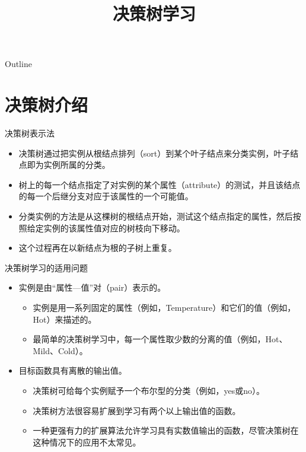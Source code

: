 \documentclass[presentation]{beamer}
\date{}
\title{决策树学习}
\begin{document}
\maketitle
\begin{frame}{Outline}
\tableofcontents
\end{frame}







\section{决策树介绍}
\label{sec:orgd053a1c}
\begin{frame}[label={sec:org9dfa2b5}]{决策树表示法}
\begin{itemize}
\item 决策树通过把实例从根结点排列（sort）到某个叶子结点来分类实例，叶子结点即为实例所属的分类。
\item 树上的每一个结点指定了对实例的某个属性（attribute）的测试，并且该结点的每一个后继分支对应于该属性的一个可能值。
\item 分类实例的方法是从这棵树的根结点开始，测试这个结点指定的属性，然后按照给定实例的该属性值对应的树枝向下移动。
\item 这个过程再在以新结点为根的子树上重复。
\end{itemize}
\end{frame}

\begin{frame}[label={sec:orgd9e3905}]{决策树学习的适用问题}
\begin{itemize}
\item 实例是由“属性---值”对（pair）表示的。
\begin{itemize}
\item 实例是用一系列固定的属性（例如，Temperature）和它们的值（例如，Hot）来描述的。
\item 最简单的决策树学习中，每一个属性取少数的分离的值（例如，Hot、Mild、Cold）。
\end{itemize}
\item 目标函数具有离散的输出值。
\begin{itemize}
\item 决策树可给每个实例赋予一个布尔型的分类（例如，yes或no）。
\item 决策树方法很容易扩展到学习有两个以上输出值的函数。
\item 一种更强有力的扩展算法允许学习具有实数值输出的函数，尽管决策树在这种情况下的应用不太常见。
\end{itemize}
\end{itemize}
\end{frame}
\end{document}
